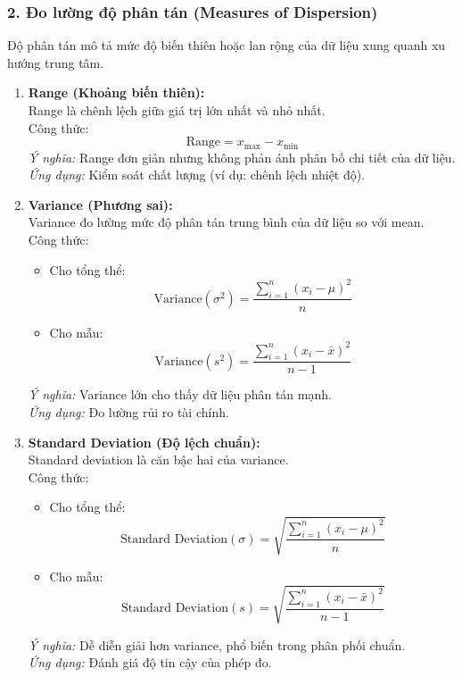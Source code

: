 \documentclass[a4paper,12pt]{article}
\begin{document}
\subsubsection*{2. Đo lường độ phân tán (Measures of Dispersion)}
Độ phân tán mô tả mức độ biến thiên hoặc lan rộng của dữ liệu xung quanh xu hướng trung tâm.

\begin{enumerate}[label=\Roman*.]
    \item \textbf{Range (Khoảng biến thiên):} \\
    Range là chênh lệch giữa giá trị lớn nhất và nhỏ nhất. \\
    Công thức:
    \[
    \text{Range} = x_{\text{max}} - x_{\text{min}}
    \]
    \textit{Ý nghĩa:} Range đơn giản nhưng không phản ánh phân bố chi tiết của dữ liệu. \\
    \textit{Ứng dụng:} Kiểm soát chất lượng (ví dụ: chênh lệch nhiệt độ).

    \item \textbf{Variance (Phương sai):} \\
    Variance đo lường mức độ phân tán trung bình của dữ liệu so với mean. \\
    Công thức:
    \begin{itemize}
        \item Cho tổng thể:
        \[
        \text{Variance} (\sigma^2) = \frac{\sum_{i=1}^{n} (x_i - \mu)^2}{n}
        \]
        \item Cho mẫu:
        \[
        \text{Variance} (s^2) = \frac{\sum_{i=1}^{n} (x_i - \bar{x})^2}{n-1}
        \]
    \end{itemize}
    \textit{Ý nghĩa:} Variance lớn cho thấy dữ liệu phân tán mạnh. \\
    \textit{Ứng dụng:} Đo lường rủi ro tài chính.

    \item \textbf{Standard Deviation (Độ lệch chuẩn):} \\
    Standard deviation là căn bậc hai của variance. \\
    Công thức:
    \begin{itemize}
        \item Cho tổng thể:
        \[
        \text{Standard Deviation} (\sigma) = \sqrt{\frac{\sum_{i=1}^{n} (x_i - \mu)^2}{n}}
        \]
        \item Cho mẫu:
        \[
        \text{Standard Deviation} (s) = \sqrt{\frac{\sum_{i=1}^{n} (x_i - \bar{x})^2}{n-1}}
        \]
    \end{itemize}
    \textit{Ý nghĩa:} Dễ diễn giải hơn variance, phổ biến trong phân phối chuẩn. \\
    \textit{Ứng dụng:} Đánh giá độ tin cậy của phép đo.


\end{enumerate}
\end{document}
